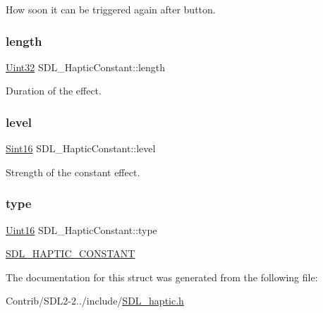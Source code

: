 How soon it can be triggered again after button. \mbox{\label{struct_s_d_l___haptic_constant_aeb994c356b1d236b060f277d157e98ec}} 
\subsubsection{\texorpdfstring{length}{length}}
{\footnotesize\ttfamily \mbox{\hyperlink{_s_d_l__stdinc_8h_add440eff171ea5f55cb00c4a9ab8672d}{Uint32}} S\+D\+L\+\_\+\+Haptic\+Constant\+::length}

Duration of the effect. \mbox{\label{struct_s_d_l___haptic_constant_a5b095eea77464623ed57af15f29f4ca6}} 
\subsubsection{\texorpdfstring{level}{level}}
{\footnotesize\ttfamily \mbox{\hyperlink{_s_d_l__stdinc_8h_a9d0257032c0e146ab6121bf0122712f5}{Sint16}} S\+D\+L\+\_\+\+Haptic\+Constant\+::level}

Strength of the constant effect. \mbox{\label{struct_s_d_l___haptic_constant_a5cb31202803a8bc1be95fcede5ac8afb}} 
\subsubsection{\texorpdfstring{type}{type}}
{\footnotesize\ttfamily \mbox{\hyperlink{_s_d_l__stdinc_8h_a31fcc0a076c9068668173ee26d33e42b}{Uint16}} S\+D\+L\+\_\+\+Haptic\+Constant\+::type}

\mbox{\hyperlink{_s_d_l__haptic_8h_a955fb9f680dcf9cc72a3d5263e85b80a}{S\+D\+L\+\_\+\+H\+A\+P\+T\+I\+C\+\_\+\+C\+O\+N\+S\+T\+A\+NT}} 

The documentation for this struct was generated from the following file\+:\begin{DoxyCompactItemize}
\item 
Contrib/\+S\+D\+L2-\/2../include/\mbox{\hyperlink{_s_d_l__haptic_8h}{S\+D\+L\+\_\+haptic.\+h}}\end{DoxyCompactItemize}
